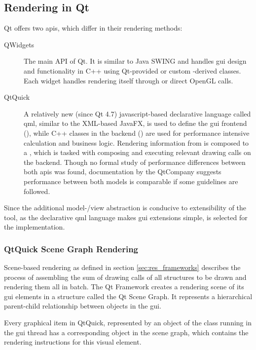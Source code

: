 \subsection{Rendering in Qt}
\label{sec:qtrender}
Qt offers two \gls{api}s, which differ in their rendering methods:
\begin{description}
	\item [QWidgets] The main API of Qt. It is similar to Java SWING and handles \gls{gui} design and functionality in C++ using Qt-provided or custom -derived classes. Each widget handles rendering itself through  or direct OpenGL calls.
	\item [QtQuick] A relatively new (since Qt 4.7) javascript-based declarative language called \gls{qml}, similar to the XML-based JavaFX, is used to define the \gls{gui} frontend (), while C++ classes in the backend () are used for performance intensive calculation and business logic. Rendering information from  is composed to a , which is tasked with composing and executing relevant drawing calls on the backend. Though no formal study of performance differences between both \gls{api}s was found, documentation by the QtCompany suggests performance between both models is comparable if some guidelines are followed.
\end{description}

Since the additional model-/view abstraction is conducive to extensibility of the tool, as the declarative \gls{qml} language makes \gls{gui} extensions simple,  is selected for the implementation.

\subsubsection{QtQuick Scene Graph Rendering}
Scene-based rendering as defined in section \ref{sec:res_frameworks} describes the process of assembling the sum of drawing calls of all structures to be drawn and rendering them all in batch.
The Qt Framework creates a rendering scene of its \gls{gui} elements in a structure called the Qt Scene Graph.
It represents a hierarchical parent-child relationship between objects in the \gls{gui}.

Every graphical item in QtQuick, represented by an object of the  class running in the \gls{gui} thread has a corresponding  object in the scene graph, which contains the rendering instructions for this visual element.


